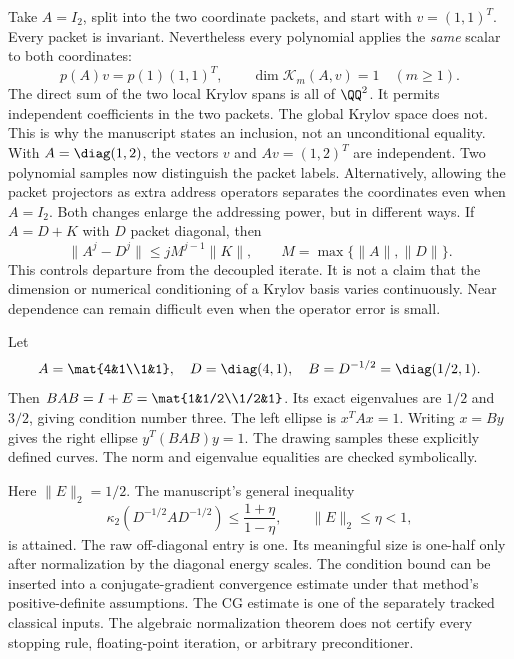 Take $A=I_2$, split into the two coordinate packets, and start with $v=(1,1)^T$. Every packet is invariant. Nevertheless every polynomial applies the \emph{same} scalar to both coordinates:
\[
p(A)v=p(1)(1,1)^T,\qquad \dim\mathcal K_m(A,v)=1\quad(m\ge1).
\]
The direct sum of the two local Krylov spans is all of $\QQ^2$. It permits independent coefficients in the two packets. The global Krylov space does not. This is why the manuscript states an inclusion, not an unconditional equality.
With $A=\diag(1,2)$, the vectors $v$ and $Av=(1,2)^T$ are independent. Two polynomial samples now distinguish the packet labels. Alternatively, allowing the packet projectors as extra address operators separates the coordinates even when $A=I_2$. Both changes enlarge the addressing power, but in different ways.
If $A=D+K$ with $D$ packet diagonal, then
\[
\|A^j-D^j\|\le jM^{j-1}\|K\|,
\qquad M=\max\{\|A\|,\|D\|\}.
\]
This controls departure from the decoupled iterate. It is not a claim that the dimension or numerical conditioning of a Krylov basis varies continuously. Near dependence can remain difficult even when the operator error is small.

Let
\[
A=\mat{4&1\\1&1},\quad D=\diag(4,1),\quad
B=D^{-1/2}=\diag(1/2,1).
\]
Then $BAB=I+E=\mat{1&1/2\\1/2&1}$. Its exact eigenvalues are $1/2$ and $3/2$, giving condition number three.
The left ellipse is $x^TAx=1$. Writing $x=By$ gives the right ellipse $y^T(BAB)y=1$. The drawing samples these explicitly defined curves. The norm and eigenvalue equalities are checked symbolically.

Here $\|E\|_2=1/2$. The manuscript's general inequality
\[
\kappa_2(D^{-1/2}AD^{-1/2})
\le\frac{1+\eta}{1-\eta},\qquad \|E\|_2\le\eta<1,
\]
is attained. The raw off-diagonal entry is one. Its meaningful size is one-half only after normalization by the diagonal energy scales.
The condition bound can be inserted into a conjugate-gradient convergence estimate under that method's positive-definite assumptions. The CG estimate is one of the separately tracked classical inputs. The algebraic normalization theorem does not certify every stopping rule, floating-point iteration, or arbitrary preconditioner.

